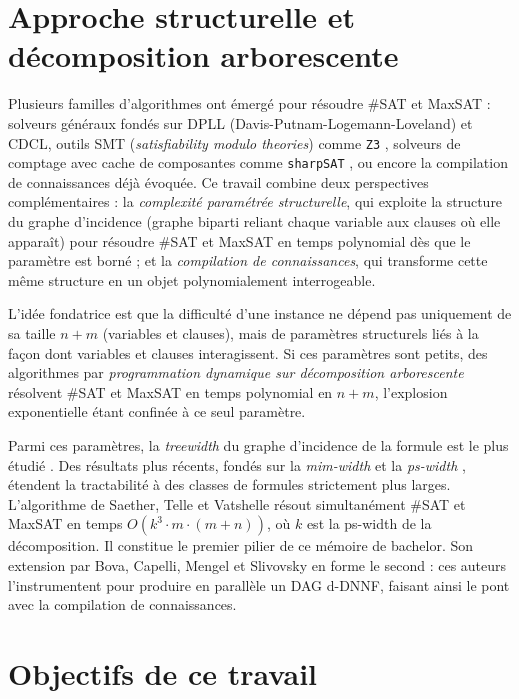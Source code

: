\documentclass[11pt,a4paper]{report}
\theoremstyle{plain}
\theoremstyle{definition}
\begin{document}
\section{Approche structurelle et décomposition arborescente}

Plusieurs familles d'algorithmes ont émergé pour résoudre \#SAT et MaxSAT :
solveurs généraux fondés sur DPLL (Davis-Putnam-Logemann-Loveland) et CDCL,
outils SMT (\emph{satisfiability modulo theories}) comme \texttt{Z3}
\cite{moura2008}, solveurs de comptage avec cache de composantes comme
\texttt{sharpSAT} \cite{thurley2006}, ou encore la compilation de connaissances
déjà évoquée. Ce travail combine deux perspectives complémentaires : la
\emph{complexité paramétrée structurelle}, qui exploite la structure du graphe
d'incidence (graphe biparti reliant chaque variable aux clauses où elle
apparaît) pour résoudre \#SAT et MaxSAT en temps polynomial dès que le
paramètre est borné ; et la \emph{compilation de connaissances}, qui transforme
cette même structure en un objet polynomialement interrogeable.

L'idée fondatrice est que la difficulté d'une instance ne dépend pas uniquement
de sa taille $n + m$ (variables et clauses), mais de paramètres structurels
liés à la façon dont variables et clauses interagissent. Si ces paramètres
sont petits, des algorithmes par \emph{programmation dynamique sur décomposition
arborescente} résolvent \#SAT et MaxSAT en temps polynomial en $n + m$,
l'explosion exponentielle étant confinée à ce seul paramètre.

Parmi ces paramètres, la \emph{treewidth} du graphe d'incidence de la formule
est le plus étudié \cite{samer2010,slivovsky2020}. Des résultats plus récents,
fondés sur la \emph{mim-width} \cite{vatshelle2012} et la \emph{ps-width}
\cite{saether2015}, étendent la tractabilité à des classes de formules
strictement plus larges. L'algorithme de Saether, Telle et Vatshelle
\cite{saether2015} résout simultanément \#SAT et MaxSAT en temps
$O(k^3 \cdot m \cdot (m+n))$, où $k$ est la ps-width de la décomposition.
Il constitue le premier pilier de ce mémoire de bachelor. Son extension par Bova, Capelli,
Mengel et Slivovsky \cite{bova2015} en forme le second : ces auteurs
l'instrumentent pour produire en parallèle un DAG d-DNNF, faisant ainsi le pont
avec la compilation de connaissances.

\section{Objectifs de ce travail}
\end{document}
